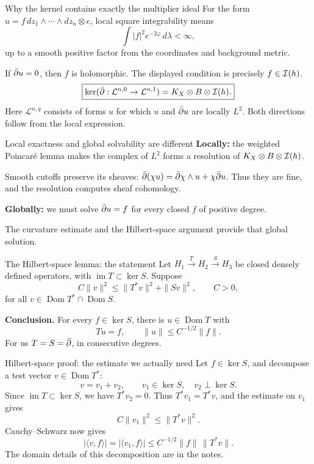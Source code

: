 \begin{frame}{Why the kernel contains exactly the multiplier ideal}
For the form \(u=f\,dz_1\wedge\cdots\wedge dz_n\otimes e\), local square integrability means
\[
\int|f|^2e^{-2\varphi}\,d\lambda<\infty,
\]
up to a smooth positive factor from the coordinates and background metric.
\par\medskip
If \(\bar\partial u=0\), then \(f\) is holomorphic. The displayed condition is precisely \(f\in\mathcal I(h)\).
\[
\boxed{\ker(\bar\partial:\mathcal L^{n,0}\to\mathcal L^{n,1})
=K_X\otimes B\otimes\mathcal I(h).}
\]
Here \(\mathcal L^{n,q}\) consists of forms \(u\) for which \(u\) and \(\bar\partial u\) are locally \(L^2\). Both directions follow from the local expression.
\end{frame}

\begin{frame}{Local exactness and global solvability are different}
\textbf{Locally:} the weighted Poincaré lemma makes the complex of \(L^2\) forms a resolution of \(K_X\otimes B\otimes\mathcal I(h)\).
\par\medskip
Smooth cutoffs preserve its sheaves: \(\bar\partial(\chi u)=\bar\partial\chi\wedge u+\chi\bar\partial u\). Thus they are fine, and the resolution computes sheaf cohomology.
\par\medskip
\textbf{Globally:} we must solve \(\bar\partial u=f\) for every closed \(f\) of positive degree.
\par\medskip
The curvature estimate and the Hilbert-space argument provide that global solution.
\end{frame}

\begin{frame}{The Hilbert-space lemma: the statement}
Let \(H_1\xrightarrow{T}H_2\xrightarrow{S}H_3\) be closed densely defined operators, with \(\operatorname{im}T\subset\ker S\). Suppose
\[
C\|v\|^2\le\|T^*v\|^2+\|Sv\|^2,\qquad C>0,
\]
for all \(v\in\operatorname{Dom}T^*\cap\operatorname{Dom}S\).
\par\medskip
\textbf{Conclusion.} For every \(f\in\ker S\), there is \(u\in\operatorname{Dom}T\) with
\[
\boxed{Tu=f,\qquad\|u\|\le C^{-1/2}\|f\|.}
\]
For us \(T=S=\bar\partial\), in consecutive degrees.
\end{frame}

\begin{frame}{Hilbert-space proof: the estimate we actually need}
Let \(f\in\ker S\), and decompose a test vector \(v\in\operatorname{Dom}T^*\):
\[
v=v_1+v_2,\qquad v_1\in\ker S,\quad v_2\perp\ker S.
\]
Since \(\operatorname{im}T\subset\ker S\), we have \(T^*v_2=0\).
Thus \(T^*v_1=T^*v\), and the estimate on \(v_1\) gives
\[
C\|v_1\|^2\le\|T^*v\|^2.
\]
Cauchy--Schwarz now gives
\[
\boxed{|\langle v,f\rangle|=|\langle v_1,f\rangle|
\le C^{-1/2}\|f\|\,\|T^*v\|.}
\]
The domain details of this decomposition are in the notes.
\end{frame}

